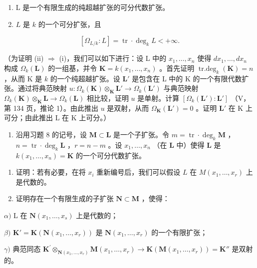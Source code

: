 \begin{enumerate}
\def\labelenumi{(\roman{enumi})}
\item
  L 是一个有限生成的纯超越扩张的可分代数扩张。
\item
  \(L\) 是 \(k\) 的一个可分扩张，且
\end{enumerate}

\[
[ \Omega_ {L / k}: L ] = \operatorname{tr} \cdot \deg_ {k} L <   + \infty .
\]

（为证明 (ii) \(\Rightarrow\) (i)，我们可以如下进行：设 L 中的 \(x_{1},\ldots ,x_{n}\) 使得 \(dx_{1},\ldots ,dx_{n}\) 构成 \(\Omega_k(\mathbf{L})\) 的一组基，并令 \(\mathbf{K} = k(x_1,\dots,x_n)\) 。首先证明 \(\operatorname {tr.deg}_k(\mathbf{K}) = n\) ，从而 K 是 \(k\) 的一个纯超越扩张。设 \(\mathbf{L}'\) 是包含在 L 中的 K 的一个有限代数扩张。通过将典范映射 \(u:\Omega_k(\mathbf{K})\otimes_\mathbf{K}\mathbf{L}'\to \Omega_k(\mathbf{L}')\) 与典范映射 \(\Omega_k(\mathbf{K})\otimes_\mathbf{K}\mathbf{L}\to \Omega_k(\mathbf{L})\) 相比较，证明 \(u\) 是单射。计算 \([\Omega_k(\mathbf{L}'):\mathbf{L}']\) （V，第 134 页，推论 1）。由此推出 \(u\) 是双射，从而 \(\Omega_{\mathbf{K}}(\mathbf{L}') = 0\) 。证明 \(\mathbf{L}'\) 在 K 上可分；由此推出 L 在 K 上可分。）

\begin{enumerate}
\def\labelenumi{\arabic{enumi})}
\setcounter{enumi}{8}
\tightlist
\item
  沿用习题 8 的记号，设 \(\mathbf{M} \subset \mathbf{L}\) 是一个子扩张。令 \(m = \operatorname{tr} \cdot \deg_k \mathbf{M}\) ，\(n = \operatorname{tr} \cdot \deg_k \mathbf{L}\) ，\(r = n - m\) 。设 \(x_1, \ldots, x_n\) （在 \(\mathbf{L}\) 中）使得 \(\mathbf{L}\) 是 \(k(x_1, \ldots, x_n) = \mathbf{K}\) 的一个可分代数扩张。
\end{enumerate}

\begin{enumerate}
\def\labelenumi{\alph{enumi})}
\item
  证明：若有必要，在将 \(x_{i}\) 重新编号后，我们可以假设 \(L\) 在 \(M(x_{1},\ldots ,x_{r})\) 上是代数的。
\item
  证明存在一个有限生成的子扩张 \(\mathbf{N} \subset \mathbf{M}\) ，使得：
\end{enumerate}

\(\alpha)\) L 在 \(\mathbf{N}(x_1,\dots,x_s)\) 上是代数的；

\(\beta)\) \(\mathbf{K}' = \mathbf{K}(\mathbf{N}(x_1,\dots,x_r))\) 是 \(\mathbf{N}(x_1,\dots,x_r)\) 的一个有限扩张；

\(\gamma)\) 典范同态 \(\mathbf{K}^{\prime}\otimes_{\mathbf{N}(x_1,\ldots ,x_r)}\mathbf{M}(x_1,\dots,x_r)\to \mathbf{K}(\mathbf{M}(x_1,\dots,x_r)) = \mathbf{K}''\) 是双射的。

